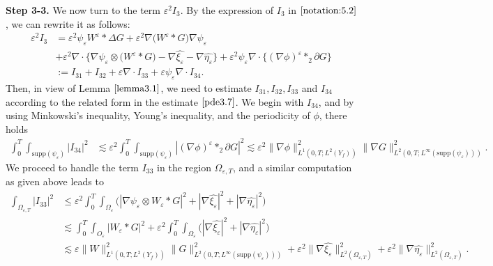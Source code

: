 \documentclass[13pt,CJK]{article}
\theoremstyle{plain}                       %
\theoremstyle{remark}
\numberwithin{equation}{section}
\begin{document}
\textbf{Step 3-3.} We now turn to the term $\varepsilon^2I_3$.
By the expression of $I_3$ in $\eqref{notation:5.2}$, we can rewrite it as follows:
\begin{equation*}
\begin{aligned}
\varepsilon^2 I_3
&=
\varepsilon^2\psi_{\varepsilon} W^{\varepsilon}\ast\Delta G
+\varepsilon^2\nabla\big(W^{\varepsilon}\ast G\big)\nabla
\psi_{\varepsilon}\\
&+\varepsilon^2\nabla\cdot
\bigg\{
\nabla\psi_{\varepsilon}\otimes \big(W^{\varepsilon}\ast G\big)
-\nabla\hat{\xi_{\varepsilon}}-\nabla\hat{\eta_{\varepsilon}}\bigg\}
+\varepsilon^2\psi_{\varepsilon}
\nabla\cdot
\Big\{
(\nabla\phi)^{\varepsilon}\ast_2\partial G
\Big\}\\
&:=I_{31}+I_{32}+\varepsilon \nabla\cdot I_{33}
+\varepsilon \psi_{\varepsilon}
\nabla\cdot I_{34}.
\end{aligned}
\end{equation*}
Then, in view of Lemma $\ref{lemma3.1}$, we need to estimate
$I_{31},I_{32},I_{33}$ and $I_{34}$ according to the related form in
the estimate $\eqref{pde3.7}$. We begin with $I_{34}$, and
by using Minkowski's inequality, Young's inequality, and
the periodicity of $\phi$, there holds
\begin{equation*}
\begin{aligned}
\int_{0}^{T}\int_{\text{supp}(\psi_{\varepsilon})}
|I_{34}|^2
&\lesssim \varepsilon^2
\int_{0}^{T}\int_{\text{supp}(\psi_{\varepsilon})}
|(\nabla \phi)^{\varepsilon}\ast_2\partial G|^2
\lesssim \varepsilon^2
\|\nabla\phi\|^2_{L^1(0,T;L^2(Y_f))}\|\nabla G\|^2_{L^2(0,T;L^{\infty}
(\text{supp}(\psi_{\varepsilon})))}.
\end{aligned}
\end{equation*}
We proceed to handle the term $I_{33}$ in the region $\Omega_{\varepsilon,T}$, and a similar computation as given above leads to
\begin{equation*}
\begin{aligned}
\int_{\Omega_{\varepsilon,T}}|I_{33}|^2&
\leq \varepsilon^2\int_{0}^{T}\int_{\Omega_{\varepsilon}}
\big(|\nabla\psi_{\varepsilon}\otimes W_{\varepsilon}\ast G|^2+|\nabla\hat{\xi_{\varepsilon}}|^2
+|\nabla\hat{\eta_{\varepsilon}}|^2\big)\\
&\lesssim \int_{0}^{T}
\int_{O_{\varepsilon}}|W_{\varepsilon}\ast G|^2
+\varepsilon^2\int_{0}^{T}\int_{\Omega_{\varepsilon}}
\big(|\nabla\hat{\xi_{\varepsilon}}|^2
+|\nabla\hat{\eta_{\varepsilon}}|^2\big) \\
&\lesssim\varepsilon
\|W\|^2_{L^1(0,T;L^2(Y_f))}\|G\|^2_{L^2(0,T;
L^{\infty}
(\text{supp}(\psi_{\varepsilon})))}+
\varepsilon^2\|\nabla\hat{\xi_{\varepsilon}}\|^2_{
L^2(\Omega_{\varepsilon,T})}
+\varepsilon^2\|\nabla\hat{\eta_{\varepsilon}}\|^2_{
L^2(\Omega_{\varepsilon,T})}.
\end{aligned}
\end{equation*}
\end{document}
